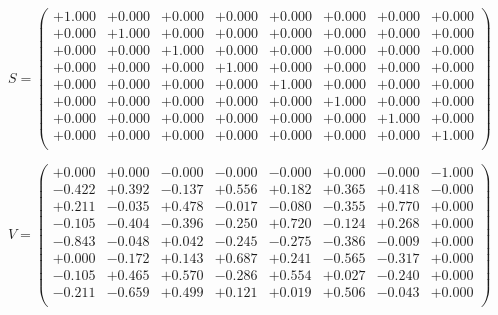 \documentclass[9pt]{article}
\theoremstyle{plain}
\theoremstyle{definition}
\theoremstyle{remark}
\numberwithin{equation}{section}
\begin{document}
$S = \left(
\begin{array}{
cccccccc}
+1.000 & +0.000 & +0.000 & +0.000 & +0.000 & +0.000 & +0.000 & +0.000 \\
+0.000 & +1.000 & +0.000 & +0.000 & +0.000 & +0.000 & +0.000 & +0.000 \\
+0.000 & +0.000 & +1.000 & +0.000 & +0.000 & +0.000 & +0.000 & +0.000 \\
+0.000 & +0.000 & +0.000 & +1.000 & +0.000 & +0.000 & +0.000 & +0.000 \\
+0.000 & +0.000 & +0.000 & +0.000 & +1.000 & +0.000 & +0.000 & +0.000 \\
+0.000 & +0.000 & +0.000 & +0.000 & +0.000 & +1.000 & +0.000 & +0.000 \\
+0.000 & +0.000 & +0.000 & +0.000 & +0.000 & +0.000 & +1.000 & +0.000 \\
+0.000 & +0.000 & +0.000 & +0.000 & +0.000 & +0.000 & +0.000 & +1.000 \\
\end{array}
\right)$ \newline 

$V = \left(
\begin{array}{
cccccccc}
+0.000 & +0.000 & -0.000 & -0.000 & -0.000 & +0.000 & -0.000 & -1.000 \\
-0.422 & +0.392 & -0.137 & +0.556 & +0.182 & +0.365 & +0.418 & -0.000 \\
+0.211 & -0.035 & +0.478 & -0.017 & -0.080 & -0.355 & +0.770 & +0.000 \\
-0.105 & -0.404 & -0.396 & -0.250 & +0.720 & -0.124 & +0.268 & +0.000 \\
-0.843 & -0.048 & +0.042 & -0.245 & -0.275 & -0.386 & -0.009 & +0.000 \\
+0.000 & -0.172 & +0.143 & +0.687 & +0.241 & -0.565 & -0.317 & +0.000 \\
-0.105 & +0.465 & +0.570 & -0.286 & +0.554 & +0.027 & -0.240 & +0.000 \\
-0.211 & -0.659 & +0.499 & +0.121 & +0.019 & +0.506 & -0.043 & +0.000 \\
\end{array}
\right)$ \newline 
\end{document}
